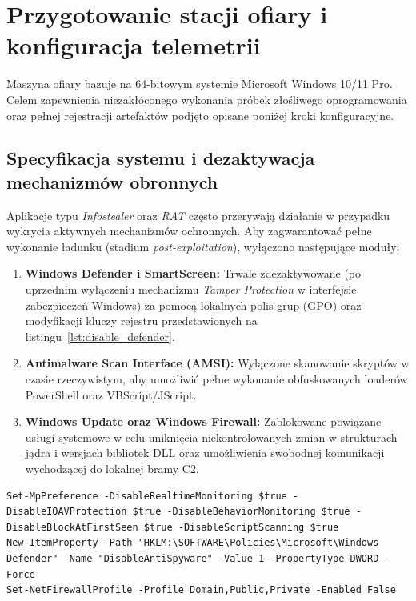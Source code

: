 \section{Przygotowanie stacji ofiary i konfiguracja telemetrii}\label{sec:konfiguracja_windows}

Maszyna ofiary bazuje na 64-bitowym systemie Microsoft Windows 10/11 Pro. Celem zapewnienia niezakłóconego wykonania próbek złośliwego oprogramowania oraz pełnej rejestracji artefaktów podjęto opisane poniżej kroki konfiguracyjne.

\subsection{Specyfikacja systemu i dezaktywacja mechanizmów obronnych}\label{subsec:dezaktywacja_obrony}

Aplikacje typu \textit{Infostealer} oraz \textit{RAT} często przerywają działanie w przypadku wykrycia aktywnych mechanizmów ochronnych. Aby zagwarantować pełne wykonanie ładunku (stadium \textit{post-exploitation}), wyłączono następujące moduły:
\begin{enumerate}
    \item \textbf{Windows Defender i SmartScreen:} Trwale zdezaktywowane (po uprzednim wyłączeniu mechanizmu \textit{Tamper Protection} w interfejsie zabezpieczeń Windows) za pomocą lokalnych polis grup (GPO) oraz modyfikacji kluczy rejestru przedstawionych na listingu~\ref{lst:disable_defender}.
    \item \textbf{Antimalware Scan Interface (AMSI):} Wyłączone skanowanie skryptów w czasie rzeczywistym, aby umożliwić pełne wykonanie obfuskowanych loaderów PowerShell oraz VBScript/JScript.
    \item \textbf{Windows Update oraz Windows Firewall:} Zablokowane powiązane usługi systemowe w celu uniknięcia niekontrolowanych zmian w strukturach jądra i wersjach bibliotek DLL oraz umożliwienia swobodnej komunikacji wychodzącej do lokalnej bramy C2.
\end{enumerate}

\begin{lstlisting}[style=terminal, caption={Dezaktywacja ochrony Windows Defender i zapory z poziomu PowerShell}, label={lst:disable_defender}]
Set-MpPreference -DisableRealtimeMonitoring $true -DisableIOAVProtection $true -DisableBehaviorMonitoring $true -DisableBlockAtFirstSeen $true -DisableScriptScanning $true
New-ItemProperty -Path "HKLM:\SOFTWARE\Policies\Microsoft\Windows Defender" -Name "DisableAntiSpyware" -Value 1 -PropertyType DWORD -Force
Set-NetFirewallProfile -Profile Domain,Public,Private -Enabled False
\end{lstlisting}

